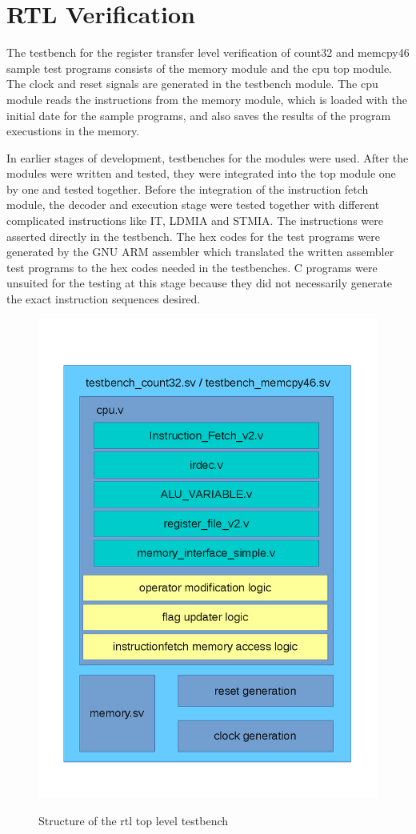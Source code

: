 \section{RTL Verification}
\label{sec:rtlverification}
The testbench for the register transfer level verification of count32 and memcpy46 sample test programs consists of the memory module and the cpu top module. The clock and reset signals are generated in the testbench module. The cpu module reads the instructions from the memory module, which is loaded with the initial date for the sample programs, and also saves the results of the program execustions in the memory.

In earlier stages of development, testbenches for the modules were used. After the modules were written and tested, they were integrated into the top module one by one and tested together. Before the integration of the instruction fetch module, the decoder and execution stage were tested together with different complicated instructions like IT, LDMIA and STMIA. The instructions were asserted directly in the testbench. The hex codes for the test programs were generated by the GNU ARM assembler which translated the written assembler test programs to the hex codes needed in the testbenches. C programs were unsuited for the testing at this stage because they did not necessarily generate the exact instruction sequences desired.

\begin{figure}
\centering
\includegraphics[scale=0.5]{images/rtltestbenchdrawing.png}
\label{fig:rtltestbenchdrawing}
\caption{Structure of the rtl top level testbench}
\end{figure}